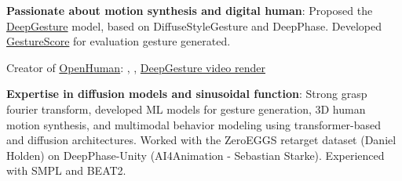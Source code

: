 	\begin{onecolentry}
		\begin{highlightsforbulletentries}
			\item \textbf{Passionate about motion synthesis and digital human}:  Proposed the \href{https://deepgesture.github.io}{DeepGesture} model, based on DiffuseStyleGesture and DeepPhase. Developed \href{https://github.com/GestureScore/GestureScore}{GestureScore} for evaluation gesture generated.
			
			Creator of \href{https://www.youtube.com/@openhuman_ai}{OpenHuman}: , ,
			\href{https://www.youtube.com/watch?v=B6nv1kQmi-Q}{DeepGesture video render}
			
			
			
			\item \textbf{Expertise in diffusion models and sinusoidal function}: Strong grasp fourier transform, developed ML models for gesture generation, 3D human motion synthesis, and multimodal behavior modeling using transformer-based and diffusion architectures. Worked with the ZeroEGGS retarget dataset (Daniel Holden) on DeepPhase-Unity (AI4Animation - Sebastian Starke). Experienced with SMPL and BEAT2.
			
			

			


\end{highlightsforbulletentries}
\end{onecolentry}
